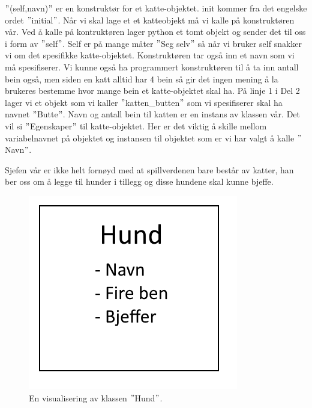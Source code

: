 $"$\twound{\text{ }}(self,navn)$"$ er en konstruktør for et katte-objektet. init kommer fra det engelske ordet $"$initial$"$. Når vi skal lage et et katteobjekt må vi kalle på konstruktøren vår. Ved å kalle på kontruktøren lager python et tomt objekt og sender det til oss i form av $"$self$"$. Self er på mange måter $"$Seg selv$"$ så når vi bruker self snakker vi om det spesifikke katte-objektet. Konstruktøren tar også inn et navn som vi må spesifiserer. Vi kunne også ha programmert konstruktøren til å ta inn antall bein også, men siden en katt alltid har 4 bein så gir det ingen mening å la brukeres bestemme hvor mange bein et katte-objektet skal ha. På linje 1 i Del 2 lager vi et objekt som vi kaller $"$katten\_butten$"$ som vi spesifiserer skal ha navnet $"$Butte$"$. Navn og antall bein til katten er en instans av klassen vår. Det vil si $"$Egenskaper$"$ til katte-objektet. Her er det viktig å skille mellom variabelnavnet på objektet og instansen til objektet som er vi har valgt å kalle $"$Navn$"$.

Sjefen vår er ikke helt fornøyd med at spillverdenen bare består av katter, han ber oss om å legge til hunder i tillegg og disse hundene skal kunne bjeffe.

\begin{figure}[H]
    \centering
    \includegraphics[scale=0.5]{Figures/Klasser_hund.png}
    \caption{En visualisering av klassen $"$Hund$"$.}
    \label{fig:klasse_hund}
\end{figure}

